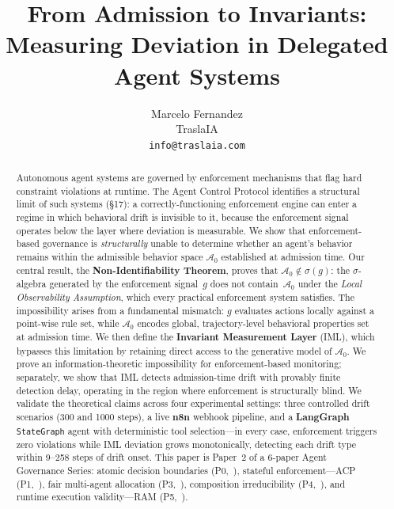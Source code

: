 \documentclass[11pt]{article}
\title{\textbf{From Admission to Invariants:}\\
       \large Measuring Deviation in Delegated Agent Systems}
\author{Marcelo Fernandez \\ \small TraslaIA \\ \small \texttt{info@traslaia.com}}
\date{}
\newcommand{\Azero}{\mathcal{A}_0}
\newcommand{\sigg}{\sigma(g)}
\begin{document}
\maketitle

\begin{abstract}
Autonomous agent systems are governed by enforcement mechanisms that flag
hard constraint violations at runtime.  The Agent Control Protocol
\citep{fernandez2026acp} identifies a structural limit of such systems
(\S17): a correctly-functioning enforcement engine can enter a regime in
which behavioral drift is invisible to it, because the enforcement signal
operates below the layer where deviation is measurable.
We show that enforcement-based governance is \emph{structurally} unable to
determine whether an agent's behavior
remains within the admissible behavior space $\Azero$ established at admission
time.  Our central result, the \textbf{Non-Identifiability Theorem}, proves
that $\Azero \notin \sigg$: the $\sigma$-algebra generated by the enforcement
signal~$g$ does not contain~$\Azero$ under the \emph{Local Observability
Assumption}, which every practical enforcement system satisfies.
The impossibility arises from a fundamental mismatch: $g$ evaluates actions
locally against a point-wise rule set, while $\Azero$ encodes global,
trajectory-level behavioral properties set at admission time.
We then define the \textbf{Invariant Measurement Layer} (IML), which bypasses
this limitation by retaining direct access to the generative model of
$\Azero$.  We prove an information-theoretic impossibility for enforcement-based
monitoring; separately, we show that IML detects admission-time drift with
provably finite detection delay, operating in the region where enforcement is
structurally blind.
We validate the theoretical claims across four experimental settings:
three controlled drift scenarios (300 and 1000 steps), a live \textbf{n8n}
webhook pipeline, and a \textbf{LangGraph} \texttt{StateGraph} agent with
deterministic tool selection---in every case, enforcement triggers zero
violations while IML deviation grows monotonically, detecting each drift
type within 9--258 steps of drift onset.
This paper is Paper~2 of a 6-paper Agent Governance Series:
atomic decision boundaries (P0,~\cite{fernandez2026a}),
stateful enforcement---ACP (P1,~\cite{fernandez2026acp}),
fair multi-agent allocation (P3,~\cite{fairgov26}),
composition irreducibility (P4,~\cite{fernandez2026comp}),
and runtime execution validity---RAM (P5,~\cite{fernandez2026ram}).
\end{abstract}
\end{document}
